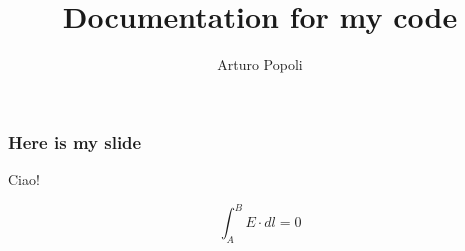 \documentclass{beamer}
\title{Documentation for my code}
\author{Arturo Popoli}
\begin{document}
	
\maketitle

\begin{frame}
	\frametitle{Here is my slide}
	
	Ciao!
	
	\begin{equation}
		\int_{A}^{B} E \cdot dl = 0
	\end{equation}
\end{frame}
\end{document}
